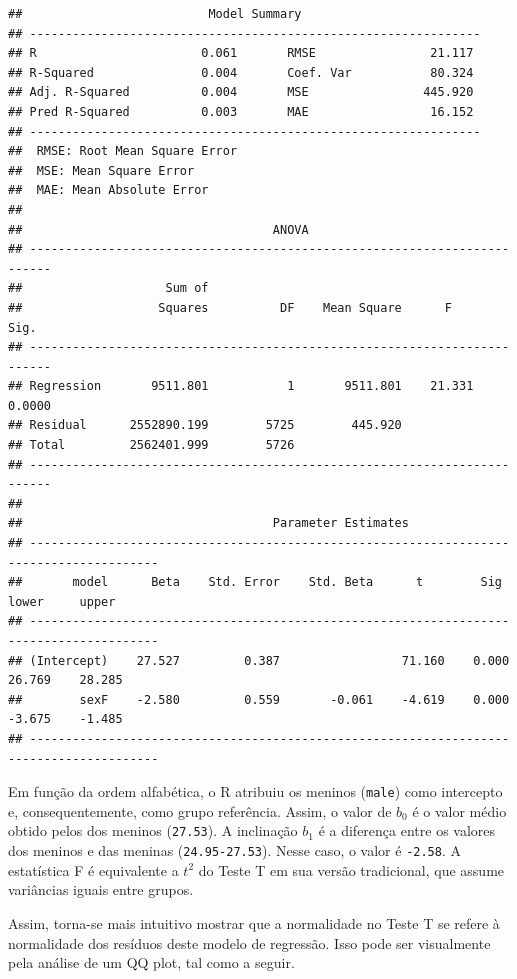 \documentclass[
]{book}
\begin{document}
\begin{verbatim}
##                          Model Summary                          
## ---------------------------------------------------------------
## R                       0.061       RMSE                21.117 
## R-Squared               0.004       Coef. Var           80.324 
## Adj. R-Squared          0.004       MSE                445.920 
## Pred R-Squared          0.003       MAE                 16.152 
## ---------------------------------------------------------------
##  RMSE: Root Mean Square Error 
##  MSE: Mean Square Error 
##  MAE: Mean Absolute Error 
## 
##                                   ANOVA                                   
## -------------------------------------------------------------------------
##                    Sum of                                                
##                   Squares          DF    Mean Square      F         Sig. 
## -------------------------------------------------------------------------
## Regression       9511.801           1       9511.801    21.331    0.0000 
## Residual      2552890.199        5725        445.920                     
## Total         2562401.999        5726                                    
## -------------------------------------------------------------------------
## 
##                                   Parameter Estimates                                    
## ----------------------------------------------------------------------------------------
##       model      Beta    Std. Error    Std. Beta      t        Sig      lower     upper 
## ----------------------------------------------------------------------------------------
## (Intercept)    27.527         0.387                 71.160    0.000    26.769    28.285 
##        sexF    -2.580         0.559       -0.061    -4.619    0.000    -3.675    -1.485 
## ----------------------------------------------------------------------------------------
\end{verbatim}

Em função da ordem alfabética, o R atribuiu os meninos (\texttt{male}) como intercepto e, consequentemente, como grupo referência. Assim, o valor de \(b_0\) é o valor médio obtido pelos dos meninos (\texttt{27.53}). A inclinação \(b_1\) é a diferença entre os valores dos meninos e das meninas (\texttt{24.95-27.53}). Nesse caso, o valor é \texttt{-2.58}. A estatística F é equivalente a \(t^2\) do Teste T em sua versão tradicional, que assume variâncias iguais entre grupos.

Assim, torna-se mais intuitivo mostrar que a normalidade no Teste T se refere à normalidade dos resíduos deste modelo de regressão. Isso pode ser visualmente pela análise de um QQ plot, tal como a seguir.
\end{document}
